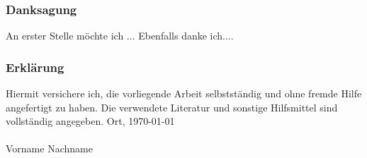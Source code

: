 \label{cha:erkl}

\subsubsection{Danksagung}
An erster Stelle möchte ich ... Ebenfalls danke ich....\par

\subsubsection{Erklärung}
Hiermit versichere ich, die vorliegende Arbeit selbstständig und ohne fremde Hilfe angefertigt zu haben. Die verwendete Literatur und sonstige Hilfsmittel sind vollständig angegeben.
\vfill
Ort, \today \\
\vspace{3cm} \\
Vorname Nachname
\vfill
